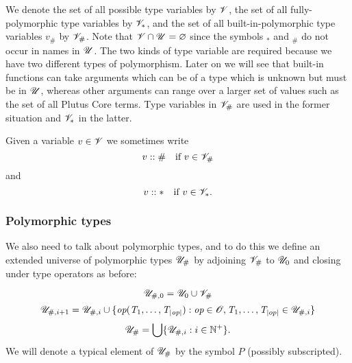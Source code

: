\medskip
\noindent
We denote the set of all possible type variables by $\mathscr{V}$, the set of all
fully-polymorphic type variables by $\mathscr{V}_*$, and the set of all
built-in-polymorphic type variables $v_\#$ by $\mathscr{V}_\#$.  Note that $\mathscr{V} \cap
\mathscr{U} = \varnothing$ since the symbols ${}_*$ and ${}_\#$ do not occur in names in $\mathscr{U}$.%
%
%
%
%
The two kinds of type variable are required because we have two different types
of polymorphism. Later on we will see that built-in functions can take arguments
which can be of a type which is unknown but must be in $\mathscr{U}$, whereas other
arguments can range over a larger set of values such as the set of all Plutus
Core terms. Type variables in $\mathscr{V}_\#$ are used in the former situation and
$\mathscr{V}_*$ in the latter.

Given a variable $v \in \mathscr{V}$ we sometimes write
$$
   v::\text{\#} \text{\quad if $v \in \mathscr{V}_\#$}
$$
and
$$
   \kindstar{v} \text{\quad if $v \in \Var_*$}.
$$


\subsubsection{Polymorphic types}
\label{sec:polymorphic-types}
We also need to talk about polymorphic types, and to do this we define an
extended universe of polymorphic types ${\mathscr{U}_{\#}}$ by adjoining $\mathscr{V}_\#$ to
$\mathscr{U}_0$ and closing under type operators as before:

$$
\mathscr{U}_{\#,0} = \mathscr{U}_0 \cup \mathscr{V}_\#
$$
$$
\mathscr{U}_{\#,i+1} = \mathscr{U}_{\#,i} \cup \{\textit{op}(\textit{T}_1, \ldots, \textit{T}_{\left| \textit{op} \right|}): \textit{op} \in \mathscr{O}, \textit{T}_1, \ldots, \textit{T}_{\left| op \right|} \in \mathscr{U}_{\#,i}\}
$$
$$
{\mathscr{U}_{\#}} = \bigcup\{\mathscr{U}_{\#,i}: i \in \mathbb{N}^{+}\}.$$%
%
\noindent We will denote a typical element of ${\mathscr{U}_{\#}}$ by the symbol $P$
(possibly subscripted).%


